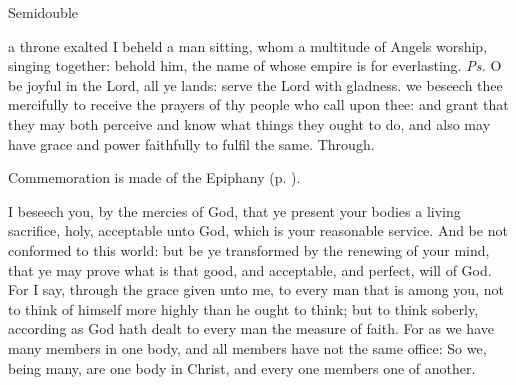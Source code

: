 \begin{inhead}
{Semidouble}
\end{inhead}

\properantiphonfix

\introit
{} a throne exalted I beheld a man sitting, whom a multitude of Angels worship, singing together: behold him, the name of whose empire is for everlasting. \textit{Ps.} O be joyful in the Lord, all ye lands: serve the Lord with gladness.
\collect
 we beseech thee mercifully to receive the prayers of thy people who call upon thee: and grant that they may both perceive and know what things they ought to do, and also may have grace and power faithfully to fulfil the same. Through.
\begin{rubric}
    Commemoration is made of the Epiphany (p. \pageref{EpiphanyMassCollect}).
\end{rubric}
 I beseech you, by the mercies of God, that ye present your bodies a living sacrifice, holy, acceptable unto God, which is your reasonable service. And be not conformed to this world: but be ye transformed by the renewing of your mind, that ye may prove what is that good, and acceptable, and perfect, will of God. For I say, through the grace given unto me, to every man that is among you, not to think of himself more highly than he ought to think; but to think soberly, according as God hath dealt to every man the measure of faith. For as we have many members in one body, and all members have not the same office: So we, being many, are one body in Christ, and every one members one of another.



